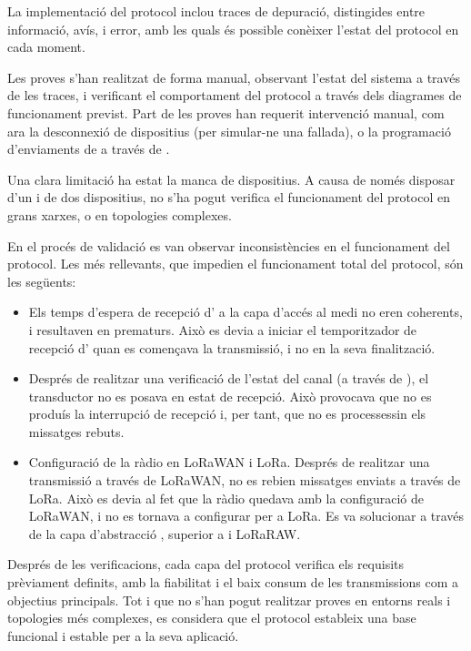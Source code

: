 \documentclass{tfgitic}[2024/07/01]
\begin{document}
{La implementació del protocol inclou traces de depuració, distingides entre informació, avís, i error, amb les quals és possible conèixer l'estat del protocol en cada moment. 

Les proves s'han realitzat de forma manual, observant l'estat del sistema a través de les traces, i verificant el comportament del protocol a través dels diagrames de funcionament previst. Part de les proves han requerit intervenció manual, com ara la desconnexió de dispositius (per simular-ne una fallada), o la programació d'enviaments de  a través de .

Una clara limitació ha estat la manca de dispositius. A causa de només disposar d'un  i de dos dispositius, no s'ha pogut verifica el funcionament del protocol en grans xarxes, o en topologies complexes. 



En el procés de validació es van observar inconsistències en el funcionament del protocol. Les més rellevants, que impedien el funcionament total del protocol, són les següents:
\begin{itemize}
    \item Els temps d'espera de recepció d' a la capa d’accés al medi no eren coherents, i resultaven en  prematurs. Això es devia a iniciar el temporitzador de recepció d' quan es començava la transmissió, i no en la seva finalització.
    \item Després de realitzar una verificació de l'estat del canal (a través de ), el transductor no es posava en estat de recepció. Això provocava que no es produís la interrupció de recepció i, per tant, que no es processessin els missatges rebuts.
    \item Configuració de la ràdio en LoRaWAN i LoRa. Després de realitzar una transmissió a través de LoRaWAN, no es rebien missatges enviats a través de LoRa. Això es devia al fet que la ràdio quedava amb la configuració de LoRaWAN, i no es tornava a configurar per a LoRa. Es va solucionar a través de la capa d'abstracció , superior a  i {LoRaRAW}.
\end{itemize}

Després de les verificacions, cada capa del protocol verifica els requisits prèviament definits, amb la fiabilitat i el baix consum de les transmissions com a objectius principals. Tot i que no s'han pogut realitzar proves en entorns reals i topologies més complexes, es considera que el protocol estableix una base funcional i estable per a la seva aplicació.

}
\end{document}
